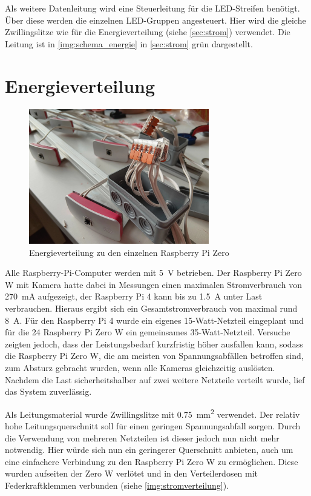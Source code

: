 \documentclass[./00PhotoBox.tex]{subfiles}
\begin{document}
Als weitere Datenleitung wird eine Steuerleitung für die LED-Streifen benötigt. Über diese werden die einzelnen LED-Gruppen angesteuert. Hier wird die gleiche Zwillingslitze wie für die Energieverteilung (siehe \autoref{sec:strom}) verwendet. Die Leitung ist in \autoref{img:schema_energie} in \autoref{sec:strom} grün dargestellt.

\section{Energieverteilung}
\label{sec:strom}

\begin{figure}[htbp]
    \centering
    \includegraphics[width=0.7\textwidth]{./img/3_aufbau/stromverteilung.jpg}
    \caption{Energieverteilung zu den einzelnen Raspberry Pi Zero}
    \label{img:stromverteilung}
\end{figure}

Alle Raspberry-Pi-Computer werden mit \SI{5}{\volt} betrieben. Der Raspberry Pi Zero W mit Kamera hatte dabei in Messungen einen maximalen Stromverbrauch von \SI{270}{\milli\ampere} aufgezeigt, der Raspberry Pi 4 kann bis zu \SI{1,5}{\ampere} unter Last verbrauchen. Hieraus ergibt sich ein Gesamtstromverbrauch von maximal rund \SI{8}{\ampere}. Für den Raspberry Pi 4 wurde ein eigenes 15-Watt-Netzteil eingeplant und für die 24 Raspberry Pi Zero W ein gemeinsames 35-Watt-Netzteil. Versuche zeigten jedoch, dass der Leistungsbedarf kurzfristig höher ausfallen kann, sodass die Raspberry Pi Zero W, die am meisten von Spannungsabfällen betroffen sind, zum Absturz gebracht wurden, wenn alle Kameras gleichzeitig auslösten. Nachdem die Last sicherheitshalber auf zwei weitere Netzteile verteilt wurde, lief das System zuverlässig.

Als Leitungsmaterial wurde Zwillingslitze mit \SI{0,75}{\square\milli\metre} verwendet. Der relativ hohe Leitungsquerschnitt soll für einen geringen Spannungsabfall sorgen. Durch die Verwendung von mehreren Netzteilen ist dieser jedoch nun nicht mehr notwendig. Hier würde sich nun ein geringerer Querschnitt anbieten, auch um eine einfachere Verbindung zu den Raspberry Pi Zero W zu ermöglichen. Diese wurden aufseiten der Zero W verlötet und in den Verteilerdosen mit Federkraftklemmen verbunden (siehe \autoref{img:stromverteilung}).
\end{document}
